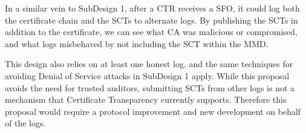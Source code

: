 In a similar vein to SubDesign 1, after a CTR receives a SFO, it could log both the
certificate chain and the SCTs to alternate logs.  By publishing the SCTs in addition
to the certificate, we can see what CA was malicious or compromised, and what logs
misbehaved by not including the SCT within the MMD.

This design also relies on at least one honest log, and the same techniques for avoiding
Denial of Service attacks in SubDesign 1 apply. While this proposal avoids the need for
trusted auditors, submitting SCTs from other logs is not a mechanism that Certificate
Transparency currently supports. Therefore this proposal would require a protocol
improvement and new development on behalf of the logs.